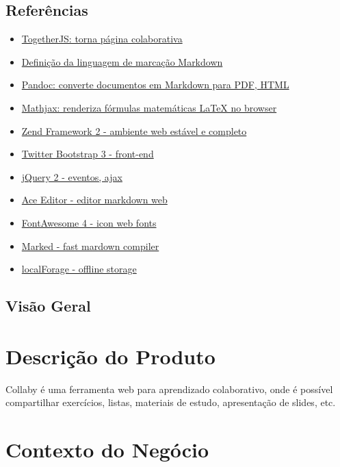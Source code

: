 \subsection{Referências}

\begin{itemize}
\item
  \href{https://togetherjs.com/}{TogetherJS: torna página colaborativa}
\item
  \href{http://daringfireball.net/projects/markdown/dingus}{Definição da
  linguagem de marcação Markdown}
\item
  \href{http://johnmacfarlane.net/pandoc/}{Pandoc: converte documentos
  em Markdown para PDF, HTML}
\item
  \href{http://www.mathjax.org/}{Mathjax: renderiza fórmulas matemáticas
  LaTeX no browser}
\item
  \href{http://framework.zend.com/zf2}{Zend Framework 2 - ambiente web
  estável e completo}
\item
  \href{http://getbootstrap.com/}{Twitter Bootstrap 3 - front-end}
\item
  \href{http://jquery.com/}{jQuery 2 - eventos, ajax}
\item
  \href{http://ace.c9.io/\#nav=about}{Ace Editor - editor markdown web}
\item
  \href{http://FontAwesome.github.io/}{FontAwesome 4 - icon web fonts}
\item
  \href{https://github.com/chjj/marked}{Marked - fast mardown compiler}
\item
  \href{https://github.com/mozilla/localForage}{localForage - offline
  storage}
\end{itemize}
\subsection{Visão Geral}

\section{Descrição do Produto}

Collaby é uma ferramenta web para aprendizado colaborativo, onde é
possível compartilhar exercícios, listas, materiais de estudo,
apresentação de slides, etc.

\section{Contexto do Negócio}

